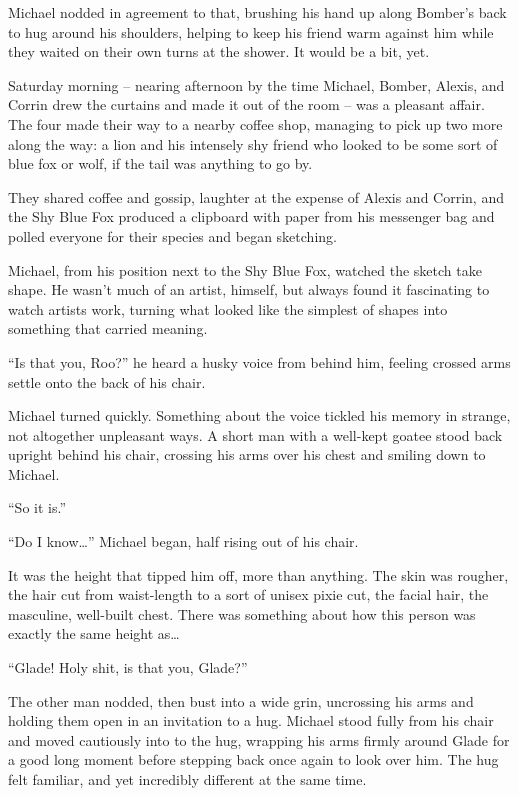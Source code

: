 Michael nodded in agreement to that, brushing his hand up along Bomber's back to hug around his shoulders, helping to keep his friend warm against him while they waited on their own turns at the shower.  It would be a bit, yet.

\secdiv

Saturday morning -- nearing afternoon by the time Michael, Bomber, Alexis, and Corrin drew the curtains and made it out of the room -- was a pleasant affair.  The four made their way to a nearby coffee shop, managing to pick up two more along the way: a lion and his intensely shy friend who looked to be some sort of blue fox or wolf, if the tail was anything to go by.

They shared coffee and gossip, laughter at the expense of Alexis and Corrin, and the Shy Blue Fox produced a clipboard with paper from his messenger bag and polled everyone for their species and began sketching.

Michael, from his position next to the Shy Blue Fox, watched the sketch take shape.  He wasn't much of an artist, himself, but always found it fascinating to watch artists work, turning what looked like the simplest of shapes into something that carried meaning.

``Is that you, Roo?'' he heard a husky voice from behind him, feeling crossed arms settle onto the back of his chair.

Michael turned quickly.  Something about the voice tickled his memory in strange, not altogether unpleasant ways.  A short man with a well-kept goatee stood back upright behind his chair, crossing his arms over his chest and smiling down to Michael.

``So it is.''

``Do I know\ldots{}'' Michael began, half rising out of his chair.

It was the height that tipped him off, more than anything.  The skin was rougher, the hair cut from waist-length to a sort of unisex pixie cut, the facial hair, the masculine, well-built chest.  There was something about how this person was exactly the same height as\ldots{}

``Glade!  Holy shit, is that you, Glade?''

The other man nodded, then bust into a wide grin, uncrossing his arms and holding them open in an invitation to a hug.  Michael stood fully from his chair and moved cautiously into to the hug, wrapping his arms firmly around Glade for a good long moment before stepping back once again to look over him.  The hug felt familiar, and yet incredibly different at the same time.

